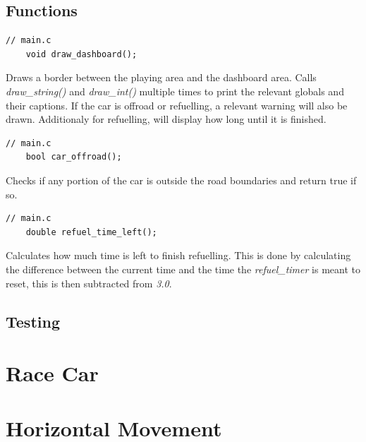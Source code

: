 \documentclass{article}
\begin{document}
\subsection*{Functions}
\begin{lstlisting}[style=CStyle]
	// main.c
	void draw_dashboard();
\end{lstlisting}
Draws a border between the playing area and the dashboard area. Calls \emph{draw\_string()} and \emph{draw\_int()} multiple times to print the relevant globals and their captions.
\newline
If the car is offroad or refuelling, a relevant warning will also be drawn. Additionaly for refuelling, will display how long until it is finished.
\newline
\begin{lstlisting}[style=CStyle]
	// main.c
	bool car_offroad();
\end{lstlisting}
Checks if any portion of the car is outside the road boundaries and return true if so.
\begin{lstlisting}[style=CStyle]
	// main.c
	double refuel_time_left();
\end{lstlisting}
Calculates how much time is left to finish refuelling. This is done by calculating the difference between the current time and the time the \emph{refuel\_timer} is meant to reset, this is then subtracted from \emph{3.0}.
\newline

\subsection*{Testing}

\clearpage

\section{Race Car}

\clearpage

\section{Horizontal Movement}
\end{document}
